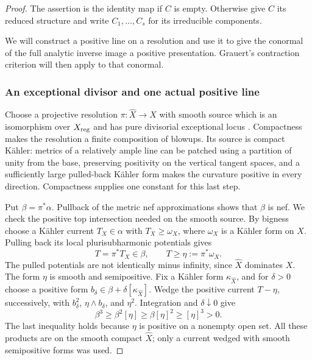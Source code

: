 \begin{proof}
The assertion is the identity map if \(C\) is empty.  Otherwise give
\(C\) its reduced structure and write \(C_1,\ldots,C_s\) for its
irreducible components.

We will construct a positive line on a resolution and use it to give
the conormal of the full analytic inverse image a positive presentation.
Grauert's contraction criterion will then apply to that conormal.

\subsubsection*{An exceptional divisor and one actual positive line}

Choose a projective resolution \(\pi:\widehat X\to X\) with smooth
source which is an isomorphism over \(X_{\rm reg}\) and has pure
divisorial exceptional locus
\cite[Theorem~2.13]{DasHaconPaun2024}.  Compactness makes the resolution
a finite composition of blowups.  Its source is compact K\"ahler:
metrics of a relatively ample line can be patched using a partition of
unity from the base, preserving positivity on the vertical tangent
spaces, and a sufficiently large pulled-back K\"ahler form makes the
curvature positive in every direction.  Compactness supplies one
constant for this last step.

Put \(\beta=\pi^*\alpha\).  Pullback of the metric nef approximations
shows that \(\beta\) is nef.  We check the positive top intersection
needed on the smooth source.  By bigness choose a K\"ahler current
\(T_X\in\alpha\) with \(T_X\geq\omega_X\), where \(\omega_X\) is a
K\"ahler form on \(X\).  Pulling back its local plurisubharmonic
potentials gives
\[
 T=\pi^*T_X\in\beta,\qquad T\geq\eta:=\pi^*\omega_X.
\]
The pulled potentials are not identically minus infinity, since
\(\widehat X\) dominates \(X\).  The form \(\eta\) is smooth and
semipositive.  Fix a K\"ahler form \(\kappa_{\widehat X}\), and for
\(\delta>0\) choose a positive form
\(b_\delta\in\beta+\delta[\kappa_{\widehat X}]\).  Wedge the positive
current \(T-\eta\), successively, with \(b_\delta^2\),
\(\eta\wedge b_\delta\), and \(\eta^2\).  Integration and
\(\delta\downarrow0\) give
\begin{equation}\label{eq:null-positive-cube}
 \beta^3\geq\beta^2[\eta]\geq\beta[\eta]^2\geq[\eta]^3>0 .
\end{equation}
The last inequality holds because \(\eta\) is positive on a nonempty
open set.  All these products are on the smooth compact \(\widehat X\);
only a current wedged with smooth semipositive forms was used.


\end{proof}
